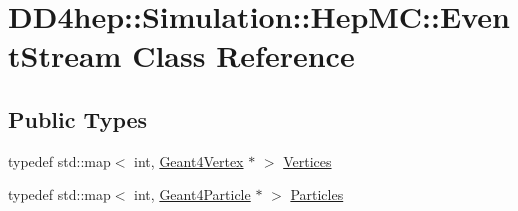 \hypertarget{class_d_d4hep_1_1_simulation_1_1_hep_m_c_1_1_event_stream}{}\section{D\+D4hep\+:\+:Simulation\+:\+:Hep\+MC\+:\+:Event\+Stream Class Reference}
\label{class_d_d4hep_1_1_simulation_1_1_hep_m_c_1_1_event_stream}
\subsection*{Public Types}
\begin{DoxyCompactItemize}
\item 
typedef std\+::map$<$ int, \hyperlink{class_d_d4hep_1_1_simulation_1_1_geant4_vertex}{Geant4\+Vertex} $\ast$ $>$ \hyperlink{class_d_d4hep_1_1_simulation_1_1_hep_m_c_1_1_event_stream_a3e270d38edde8369e52ad396615a2755}{Vertices}
\item 
typedef std\+::map$<$ int, \hyperlink{class_d_d4hep_1_1_simulation_1_1_geant4_particle}{Geant4\+Particle} $\ast$ $>$ \hyperlink{class_d_d4hep_1_1_simulation_1_1_hep_m_c_1_1_event_stream_a99e0260f816229d8ab3ebdd5487b3af1}{Particles}
\end{DoxyCompactItemize}
